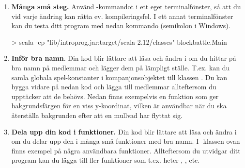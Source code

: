 \begin{enumerate}[leftmargin=*]
  \item \textbf{Många små steg.} Använd -kommandot  i ett eget terminalfönster, så att du vid varje ändring kan rätta ev. kompileringsfel. I ett annat terminalfönster kan du testa ditt program med nedan kommando (semikolon i Windows).
\begin{REPLnonum}
> scala -cp "lib/introprog.jar:target/scala-2.12/classes" blockbattle.Main
\end{REPLnonum}

  \item \textbf{Inför bra namn}. Din kod blir lättare att läsa och ändra i om du hittar på bra namn på medlemmar och lägger dem på lämpligt ställe. T.ex. kan du samla globala spel-konstanter i kompanjonsobjektet till klassen . Du kan bygga vidare på nedan kod och lägga till medlemmar allteftersom du upptäcker att de behövs. Nedan finns exempelvis en funktion som ger bakgrundsfärgen för en viss y-koordinat, vilken är användbar när du ska återställa bakgrunden efter att en mullvad har flyttat sig.
%
%
%
%
%
%
%

 \item \textbf{Dela upp din kod i funktioner.} Din kod blir lättare att läsa och ändra i om du delar upp den i många små funktioner med bra namn. I -klassen ovan finns exempel på några användbara funktioner. Allteftersom du utvidgar ditt program kan du lägga till fler funktioner som t.ex. heter , , etc.


\end{enumerate}
